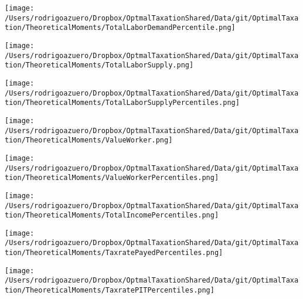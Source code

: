 \documentclass[12pt]{article}
\begin{document}
\texttt{[image: /Users/rodrigoazuero/Dropbox/OptmalTaxationShared/Data/git/OptimalTaxation/TheoreticalMoments/TotalLaborDemandPercentile.png]}

\texttt{[image: /Users/rodrigoazuero/Dropbox/OptmalTaxationShared/Data/git/OptimalTaxation/TheoreticalMoments/TotalLaborSupply.png]}

\texttt{[image: /Users/rodrigoazuero/Dropbox/OptmalTaxationShared/Data/git/OptimalTaxation/TheoreticalMoments/TotalLaborSupplyPercentiles.png]}

\texttt{[image: /Users/rodrigoazuero/Dropbox/OptmalTaxationShared/Data/git/OptimalTaxation/TheoreticalMoments/ValueWorker.png]}

\texttt{[image: /Users/rodrigoazuero/Dropbox/OptmalTaxationShared/Data/git/OptimalTaxation/TheoreticalMoments/ValueWorkerPercentiles.png]}

\texttt{[image: /Users/rodrigoazuero/Dropbox/OptmalTaxationShared/Data/git/OptimalTaxation/TheoreticalMoments/TotalIncomePercentiles.png]}


\texttt{[image: /Users/rodrigoazuero/Dropbox/OptmalTaxationShared/Data/git/OptimalTaxation/TheoreticalMoments/TaxratePayedPercentiles.png]}

\texttt{[image: /Users/rodrigoazuero/Dropbox/OptmalTaxationShared/Data/git/OptimalTaxation/TheoreticalMoments/TaxratePITPercentiles.png]}
\end{document}
